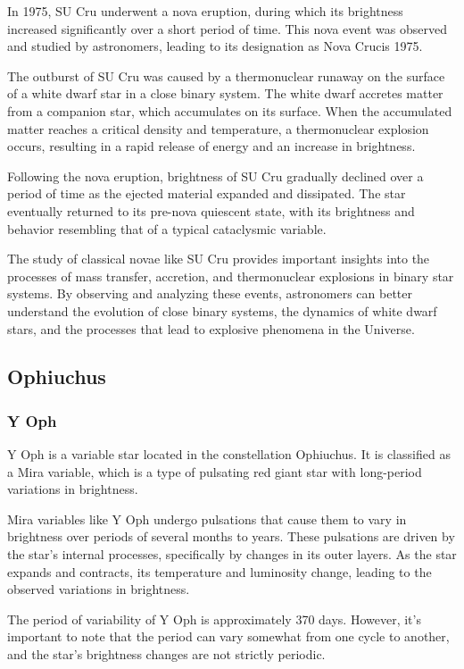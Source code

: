 In 1975, SU Cru underwent a nova eruption, during which its brightness increased significantly over a short period of time. This nova event was observed and studied by astronomers, leading to its designation as Nova Crucis 1975.

The outburst of SU Cru was caused by a thermonuclear runaway on the surface of a white dwarf star in a close binary system. The white dwarf accretes matter from a companion star, which accumulates on its surface. When the accumulated matter reaches a critical density and temperature, a thermonuclear explosion occurs, resulting in a rapid release of energy and an increase in brightness.

Following the nova eruption, brightness of SU Cru gradually declined over a period of time as the ejected material expanded and dissipated. The star eventually returned to its pre-nova quiescent state, with its brightness and behavior resembling that of a typical cataclysmic variable.

The study of classical novae like SU Cru provides important insights into the processes of mass transfer, accretion, and thermonuclear explosions in binary star systems. By observing and analyzing these events, astronomers can better understand the evolution of close binary systems, the dynamics of white dwarf stars, and the processes that lead to explosive phenomena in the Universe.



\subsection{Ophiuchus}

\subsubsection*{ Y Oph }
Y Oph is a variable star located in the constellation Ophiuchus. It is classified as a Mira variable, which is a type of pulsating red giant star with long-period variations in brightness.

Mira variables like Y Oph undergo pulsations that cause them to vary in brightness over periods of several months to years. These pulsations are driven by the star's internal processes, specifically by changes in its outer layers. As the star expands and contracts, its temperature and luminosity change, leading to the observed variations in brightness.

The period of variability of Y Oph is approximately 370 days. However, it's important to note that the period can vary somewhat from one cycle to another, and the star's brightness changes are not strictly periodic.


